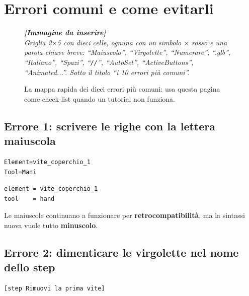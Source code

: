 ﻿\documentclass[a4paper,12pt,oneside]{book}
\newcommand{\sino}{\textcolor{cvtred}{\textbf{$\times$}}}
\newcommand{\imgph}[2]{%
  \begin{tcolorbox}[colback=cvtlightblue!30,colframe=cvtblue!40,%
    width=#1,halign=center,valign=center,height=5cm,boxrule=0.5pt,arc=3pt]%
    \textcolor{cvtgray}{\itshape\footnotesize\textbf{[Immagine da inserire]}\\[3pt]#2}%
  \end{tcolorbox}}
\begin{document}
\chapter{Errori comuni e come evitarli}
\label{ch:errori}

\begin{figure}[H]
  \centering
  \imgph{13cm}{Griglia 2$\times$5 con dieci celle, ognuna con un simbolo \sino{} rosso e una parola chiave breve: ``Maiuscolo'', ``Virgolette'', ``Numerare'', ``.glb'', ``Italiano'', ``Spazi'', ``\texttt{//}'', ``AutoSet'', ``ActiveButtons'', ``Animated...''. Sotto il titolo ``i 10 errori più comuni''.}
  \caption{La mappa rapida dei dieci errori più comuni: usa questa pagina come check-list quando un tutorial non funziona.}
  \label{fig:mappa-10-errori}
\end{figure}

\section{Errore 1: scrivere le righe con la lettera maiuscola}

\begin{sbagliato}
\begin{lstlisting}
Element=vite_coperchio_1
Tool=Mani
\end{lstlisting}
\end{sbagliato}

\begin{giusto}
\begin{lstlisting}
element = vite_coperchio_1
tool    = hand
\end{lstlisting}
\end{giusto}

Le maiuscole continuano a funzionare per \textbf{retrocompatibilità}, ma la
sintassi nuova vuole tutto \textbf{minuscolo}.

\section{Errore 2: dimenticare le virgolette nel nome dello step}

\begin{sbagliato}
\begin{lstlisting}
[step Rimuovi la prima vite]
\end{lstlisting}
\end{sbagliato}
\end{document}

